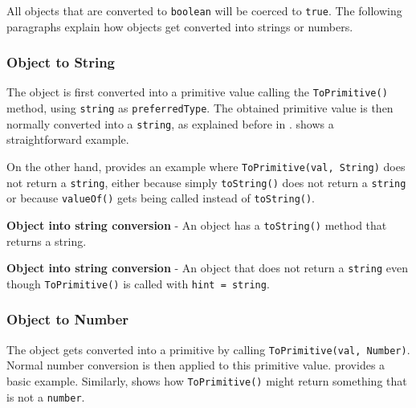 All objects that are converted to \texttt{boolean} will be coerced to \texttt{true}. The following paragraphs explain how objects get converted into strings or numbers.

\subsubsection{Object to String}
The object is first converted into a primitive value calling the \texttt{ToPrimitive()} method, using \texttt{string} as \texttt{preferredType}. The obtained primitive value is then normally converted into a \texttt{string}, as explained before in .  shows a straightforward example.

On the other hand,  provides an example where \texttt{ToPrimitive(val, String)} does not return a \texttt{string}, either because simply \texttt{toString()} does not return a \texttt{string} or because \texttt{valueOf()} gets being called instead of \texttt{toString()}.

\begin{code}
	\captionsetup{aboveskip=0pt, belowskip=10pt}
	\caption[Object into string conversion]{\textbf{Object into string conversion} - An object has a \texttt{toString()} method that returns a string.}
	\label{code:background-object-into-string}
\end{code}

\begin{code}
	\captionsetup{aboveskip=0pt, belowskip=10pt}
	\caption[Object into string conversion]{\textbf{Object into string conversion} - An object that does not return a \texttt{string} even though \texttt{ToPrimitive()} is called with \texttt{hint = string}.}
	\label{code:background-object-into-string-not-string-return-value}
\end{code}

\subsubsection{Object to Number}
The object gets converted into a primitive by calling \texttt{ToPrimitive(val, Number)}. Normal number conversion is then applied to this primitive value.  provides a basic example. Similarly,  shows how \texttt{ToPrimitive()} might return something that is not a \texttt{number}.

